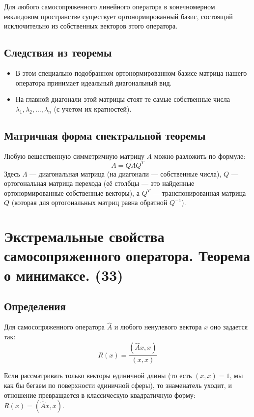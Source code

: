 \documentclass[14pt]{extreport}
\begin{document}
    \begin{thbox}
        Для любого самосопряженного линейного оператора в конечномерном евклидовом пространстве существует ортонормированный базис, состоящий исключительно из собственных векторов этого оператора.
    \end{thbox}

    \section{Следствия из теоремы}

    \begin{itemize}
        \item В этом специально подобранном ортонормированном базисе матрица нашего оператора принимает идеальный диагональный вид.
        \item На главной диагонали этой матрицы стоят те самые собственные числа $\lambda_1, \lambda_2, \dots, \lambda_n$ (с учетом их кратностей).
    \end{itemize}

    \section{Матричная форма спектральной теоремы}

    Любую вещественную симметричную матрицу $A$ можно разложить по формуле:$$A = Q \Lambda Q^T$$Здесь $\Lambda$ — диагональная матрица (на диагонали — собственные числа), $Q$ — ортогональная матрица перехода (её столбцы — это найденные ортонормированные собственные векторы), а $Q^T$ — транспонированная матрица $Q$ (которая для ортогональных матриц равна обратной $Q^{-1}$).

    \chapter{Экстремальные свойства самосопряженного оператора. Теорема о минимаксе. (33)}

    \section{Определения}

    \begin{defbox}
        Для самосопряженного оператора $\hat{A}$ и любого ненулевого вектора $x$ оно задается так:$$R(x) = \frac{(\hat{A}x, x)}{(x, x)}$$
    \end{defbox}

    \begin{defbox}
        Если рассматривать только векторы единичной длины (то есть $(x, x) = 1$, мы как бы бегаем по поверхности единичной сферы), то знаменатель уходит, и отношение превращается в классическую квадратичную форму: $R(x) = (\hat{A}x, x)$.
    \end{defbox}
\end{document}
